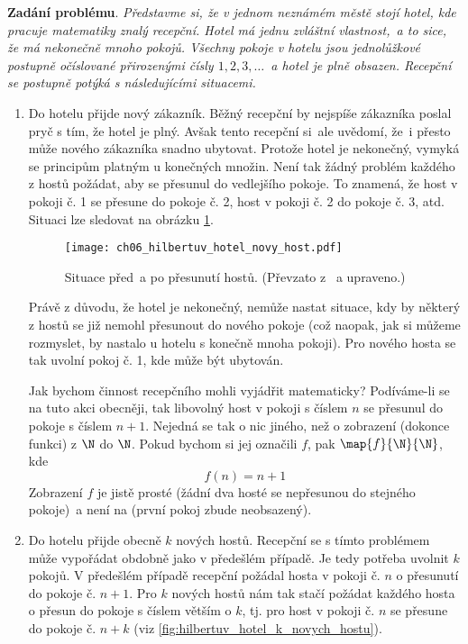 \noindent\textbf{Zadání problému}. \textit{Představme si, že v jednom neznámém městě stojí hotel, kde pracuje matematiky znalý recepční. Hotel má jednu zvláštní vlastnost,~a to sice, že má nekonečně mnoho pokojů. Všechny pokoje v hotelu jsou jednolůžkové postupně očíslované přirozenými čísly $1,2,3,\dots$~a hotel je plně obsazen. Recepční se postupně potýká s následujícími situacemi.}
\begin{enumerate}[label=\textit{(\roman*)}]
    \item\label{item:novy_host} Do hotelu přijde nový zákazník. Běžný recepční by nejspíše zákazníka poslal pryč s tím, že hotel je plný. Avšak tento recepční si~ale uvědomí, že~i přesto může nového zákazníka snadno ubytovat. Protože hotel je nekonečný, vymyká se principům platným u konečných množin. Není tak žádný problém každého z hostů požádat, aby se přesunul do vedlejšího pokoje. To znamená, že host v pokoji č. 1 se přesune do pokoje č. 2, host v pokoji č. 2 do pokoje č. 3, atd. Situaci lze sledovat na obrázku \ref{fig:hilbertuv_hotel_novy_host}.
    \begin{figure}[h]
        \centering
        \texttt{[image: ch06\_hilbertuv\_hotel\_novy\_host.pdf]}
        \caption{Situace před~a po přesunutí hostů. (Převzato z \cite{Rmoutil2022}~a upraveno.)}
        \label{fig:hilbertuv_hotel_novy_host}
    \end{figure}
    Právě z důvodu, že hotel je nekonečný, nemůže nastat situace, kdy by některý z hostů se již nemohl přesunout do nového pokoje (což naopak, jak si můžeme rozmyslet, by nastalo u hotelu s konečně mnoha pokoji). Pro nového hosta se tak uvolní pokoj č. 1, kde může být ubytován.\par
    Jak bychom činnost recepčního mohli vyjádřit matematicky? Podíváme-li se na tuto akci obecněji, tak libovolný host v pokoji s číslem $n$ se přesunul do pokoje s číslem $n+1$. Nejedná se tak o nic jiného, než o zobrazení (dokonce funkci) z $\N$ do $\N$. Pokud bychom si jej označili $f$, pak $\map{f}{\N}{\N}$, kde
    \begin{equation*}
        f(n)=n+1
    \end{equation*}
    Zobrazení $f$ je jistě prosté (žádní dva hosté se nepřesunou do stejného pokoje)~a není na (první pokoj zbude neobsazený).
    \item\label{item:k_novych_hostu} Do hotelu přijde obecně $k$ nových hostů. Recepční se s tímto problémem může vypořádat obdobně jako v předešlém případě. Je tedy potřeba uvolnit $k$ pokojů. V předešlém případě recepční požádal hosta v pokoji č. $n$ o přesunutí do pokoje č. $n+1$. Pro $k$ nových hostů nám tak stačí požádat každého hosta o přesun do pokoje s číslem větším o $k$, tj. pro host v pokoji č. $n$ se přesune do pokoje č. $n+k$ (viz \ref{fig:hilbertuv_hotel_k_novych_hostu}).

\end{enumerate}
